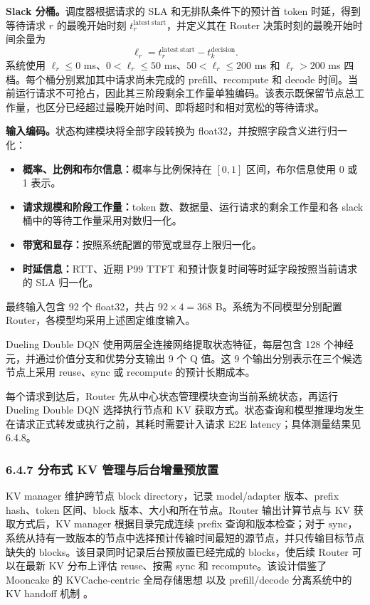 \textbf{Slack 分桶。}调度器根据请求的 SLA 和无排队条件下的预计首 token 时延，得到等待请求 \(r\) 的最晚开始时刻 \(t_r^{\mathrm{latest\ start}}\)，并定义其在 Router 决策时刻的最晚开始时间余量为
\[
\ell_r=t_r^{\mathrm{latest\ start}}-t_k^{\mathrm{decision}}.
\]
系统使用 \(\ell_r\leq0\) ms、\(0<\ell_r\leq50\) ms、\(50<\ell_r\leq200\) ms 和 \(\ell_r>200\) ms 四档。每个桶分别累加其中请求尚未完成的 prefill、recompute 和 decode 时间。当前运行请求不可抢占，因此其三阶段剩余工作量单独编码。该表示既保留节点总工作量，也区分已经超过最晚开始时间、即将超时和相对宽松的等待请求。

\textbf{输入编码。}状态构建模块将全部字段转换为 float32，并按照字段含义进行归一化：
\begin{itemize}
    \item \textbf{概率、比例和布尔信息：}概率与比例保持在 \([0,1]\) 区间，布尔信息使用 0 或 1 表示。
    \item \textbf{请求规模和阶段工作量：}token 数、数据量、运行请求的剩余工作量和各 slack 桶中的等待工作量采用对数归一化。
    \item \textbf{带宽和显存：}按照系统配置的带宽或显存上限归一化。
    \item \textbf{时延信息：}RTT、近期 P99 TTFT 和预计恢复时间等时延字段按照当前请求的 SLA 归一化。
\end{itemize}
最终输入包含 92 个 float32，共占 \(92\times4=368\) B。系统为不同模型分别配置 Router，各模型均采用上述固定维度输入。

Dueling Double DQN 使用两层全连接网络提取状态特征，每层包含 128 个神经元，并通过价值分支和优势分支输出 9 个 Q 值。这 9 个输出分别表示在三个候选节点上采用 reuse、sync 或 recompute 的预计长期成本。

每个请求到达后，Router 先从中心状态管理模块查询当前系统状态，再运行 Dueling Double DQN 选择执行节点和 KV 获取方式。状态查询和模型推理均发生在请求正式转发或执行之前，其耗时需要计入请求 E2E latency；具体测量结果见 6.4.8。

\subsubsection*{6.4.7 分布式 KV 管理与后台增量预放置}

KV manager 维护跨节点 block directory，记录 model/adapter 版本、prefix hash、token 区间、block 版本、大小和所在节点。Router 输出计算节点与 KV 获取方式后，KV manager 根据目录完成连续 prefix 查询和版本检查；对于 \(\mathrm{sync}\)，系统从持有一致版本的节点中选择预计传输时间最短的源节点，并只传输目标节点缺失的 blocks。该目录同时记录后台预放置已经完成的 blocks，使后续 Router 可以在最新 KV 分布上评估 reuse、按需 sync 和 recompute。该设计借鉴了 Mooncake 的 KVCache-centric 全局存储思想 \cite{qin2025mooncake} 以及 prefill/decode 分离系统中的 KV handoff 机制 \cite{zhong2024distserve}。

